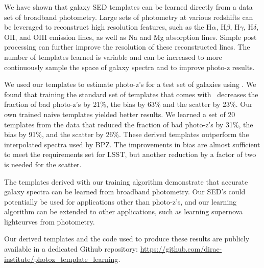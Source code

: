 
\label{sect:conclusion}

We have shown that galaxy SED templates can be learned directly from a data set of broadband photometry.
Large sets of photometry at various redshifts can be leveraged to reconstruct high resolution features, such as the H$\alpha$, H$\beta$, H$\gamma$, H$\delta$, OII, and OIII emission lines, as well as Na and Mg absorption lines.
Simple post processing can further improve the resolution of these reconstructed lines.
The number of templates learned is variable and can be increased to more continuously sample the space of galaxy spectra and to improve photo-z results.

We used our templates to estimate photo-z's for a test set of galaxies using \bpz.
We found that training the standard set of templates that comes with \bpz\ decreases the fraction of bad photo-z's by 21\%, the bias by 63\% and the scatter by 23\%.
Our own trained naive templates yielded better results.
We learned a set of 20 templates from the data that reduced the fraction of bad photo-z's by 31\%, the bias by 91\%, and the scatter by 26\%.
These derived templates outperform the interpolated spectra used by BPZ.
The improvements in bias are almost sufficient to meet the requirements set for LSST, but another reduction by a factor of two is needed for the scatter.

The templates derived with our training algorithm demonstrate that accurate galaxy spectra can be learned from broadband photometry.
Our SED's could potentially be used for applications other than photo-z's, and our learning algorithm can be extended to other applications, such as learning supernova lightcurves from photometry.

Our derived templates and the code used to produce these results are publicly available in a dedicated Github repository: \url{https://github.com/dirac-institute/photoz_template_learning}.
